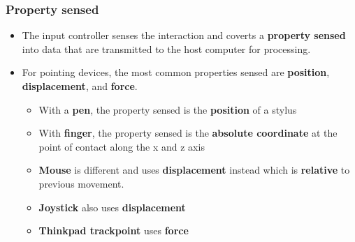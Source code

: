 \documentclass{beamer}
\begin{document}
\begin{frame}
	\frametitle{Property sensed}
	\begin{itemize}
		\item The input controller senses the interaction and coverts a \textbf{property sensed} into data that are transmitted to the host computer for processing. 
		\item For pointing devices, the most common properties sensed are \textbf{position}, \textbf{displacement}, and \textbf{force}. 
		\begin{itemize}
			\item With a \textbf{pen}, the property sensed is the \textbf{position} of a stylus
			\item With \textbf{finger}, the property sensed is the \textbf{absolute coordinate} at the point of contact along the x and z axis
			\item \textbf{Mouse} is different and uses \textbf{displacement} instead which is \textbf{relative} to previous movement.
			\item \textbf{Joystick} also uses \textbf{displacement}
			\item \textbf{Thinkpad trackpoint} uses \textbf{force}
		\end{itemize}
	\end{itemize}
\end{frame}

\end{document}
